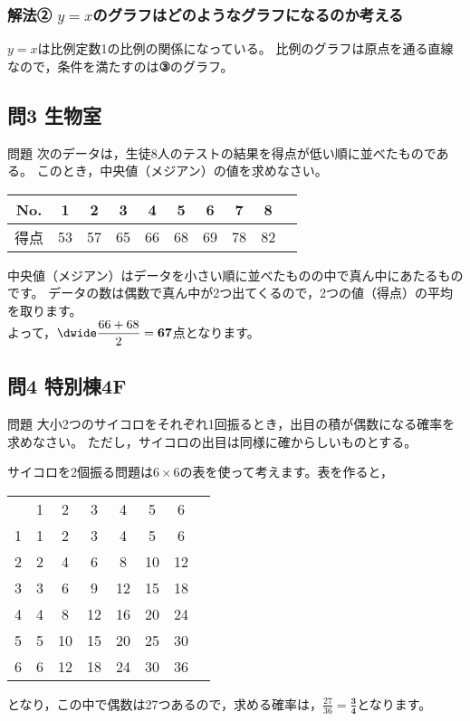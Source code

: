 \documentclass[a5paper]{ltjsarticle}
\newcommand{\bhline}{\noalign{\hrule height 1.5pt}}
\begin{document}
\subsubsection*{解法② $y=x$のグラフはどのようなグラフになるのか考える}
$y=x$は比例定数1の比例の関係になっている。
比例のグラフは原点を通る直線なので，条件を満たすのは{\bfseries③}のグラフ。


\subsection*{問3 生物室}
\begin{itembox}[l]{問題}
  次のデータは，生徒8人のテストの結果を得点が低い順に並べたものである。
  このとき，中央値（メジアン）の値を求めなさい。
  \begin{center}
  \begin{tabular}{|c||c|c|c|c|c|c|c|c|c|} \hline%
     No. & 1 & 2 & 3 & 4 & 5 & 6 & 7 & 8  \\ \hline%
     得点 & 53 & 57 & 65 & 66 & 68 & 69 & 78 & 82 \\ \hline%
  \end{tabular}
\end{center}
\end{itembox}

中央値（メジアン）はデータを小さい順に並べたものの中で真ん中にあたるものです。
データの数は偶数で真ん中が2つ出てくるので，2つの値（得点）の平均を取ります。\\
よって，$\displaystyle\dwide \frac{66+68}{2}=\mathbf{67}$点となります。


\subsection*{問4 特別棟4F}
\begin{itembox}[l]{問題}
  大小2つのサイコロをそれぞれ1回振るとき，出目の積が偶数になる確率を求めなさい。
  ただし，サイコロの出目は同様に確からしいものとする。
\end{itembox}

サイコロを2個振る問題は$6\times6$の表を使って考えます。表を作ると，
\begin{table}[H]
  \centering
  \begin{tabular}{|c||c|c|c|c|c|c|c|}%
    \hline%
      & 1 & 2 & 3 & 4 & 5 & 6 \\
    \bhline%
    1 & 1 & 2 & 3 & 4 & 5 & 6 \\
    \hline%
    2 & 2 & 4 & 6 & 8 & 10 & 12 \\
    \hline%
    3 & 3 & 6 & 9 & 12 & 15 & 18 \\
    \hline%
    4 & 4 & 8 & 12 & 16 & 20 & 24 \\
    \hline%
    5 & 5 & 10 & 15 & 20 & 25 & 30 \\
    \hline%
    6 & 6 & 12 & 18 & 24 & 30 & 36 \\
    \hline  %
  \end{tabular}
\end{table}
\noindent となり，この中で偶数は27つあるので，求める確率は，$\displaystyle \frac{27}{36}=\mathbf{\frac{3}{4}}$となります。
\end{document}
